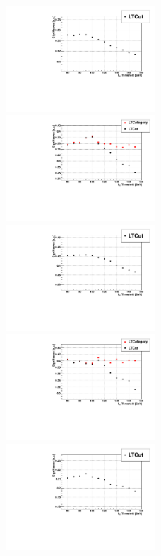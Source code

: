 \begin{figure}
  \includegraphics[width=0.5\textwidth]{4_Analisys/pics/7TeV/limits/mmt.pdf}
  \includegraphics[width=0.5\textwidth]{4_Analisys/pics/8TeV/limits/mmt.pdf} \\
  \includegraphics[width=0.5\textwidth]{4_Analisys/pics/7TeV/limits/emt.pdf}
  \includegraphics[width=0.5\textwidth]{4_Analisys/pics/8TeV/limits/emt.pdf} \\
  \includegraphics[width=0.5\textwidth]{4_Analisys/pics/7TeV/limits/eet.pdf}

\end{figure}
